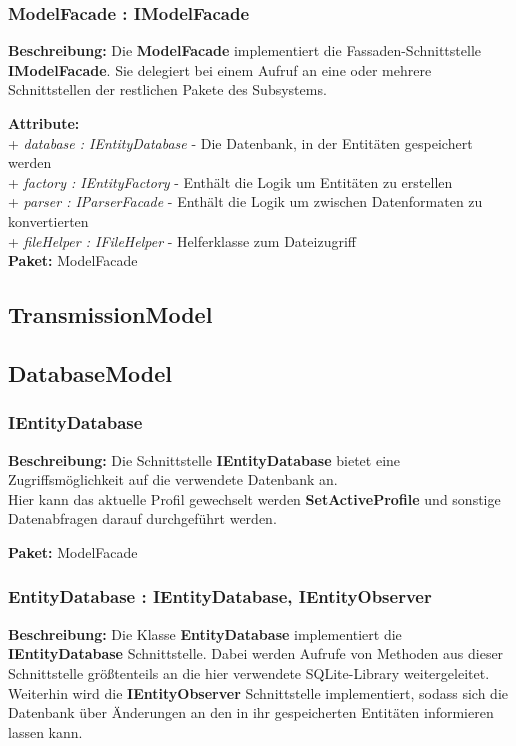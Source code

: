 \documentclass[a4paper]{scrreprt}
\begin{document}
\subsubsection{ModelFacade : IModelFacade}
\textbf{Beschreibung:} Die \textbf{ModelFacade} implementiert die Fassaden-Schnittstelle \textbf{IModelFacade}. Sie delegiert bei einem Aufruf an eine oder mehrere Schnittstellen der restlichen Pakete des Subsystems.

\textbf{Attribute:}\\
+ \textit{database : IEntityDatabase} - Die Datenbank, in der Entitäten gespeichert werden\\
+ \textit{factory : IEntityFactory} - Enthält die Logik um Entitäten zu erstellen\\
+ \textit{parser : IParserFacade} - Enthält die Logik um zwischen Datenformaten zu konvertierten\\
+ \textit{fileHelper : IFileHelper} - Helferklasse zum Dateizugriff\\

\textbf{Paket:} ModelFacade

\subsection{TransmissionModel}

\subsection{DatabaseModel}

\subsubsection{IEntityDatabase}
\textbf{Beschreibung:} Die Schnittstelle \textbf{IEntityDatabase} bietet eine Zugriffsmöglichkeit auf die verwendete Datenbank an.\\
Hier kann das aktuelle Profil gewechselt werden \textbf{SetActiveProfile} und sonstige Datenabfragen darauf durchgeführt werden.

\textbf{Paket:} ModelFacade

\subsubsection{EntityDatabase : IEntityDatabase, IEntityObserver}
\textbf{Beschreibung:} Die Klasse \textbf{EntityDatabase} implementiert die \textbf{IEntityDatabase} Schnittstelle. Dabei werden Aufrufe von Methoden aus dieser Schnittstelle größtenteils an die hier verwendete SQLite-Library weitergeleitet.\\
Weiterhin wird die \textbf{IEntityObserver} Schnittstelle implementiert, sodass sich die Datenbank über Änderungen an den in ihr gespeicherten Entitäten informieren lassen kann.
\end{document}
